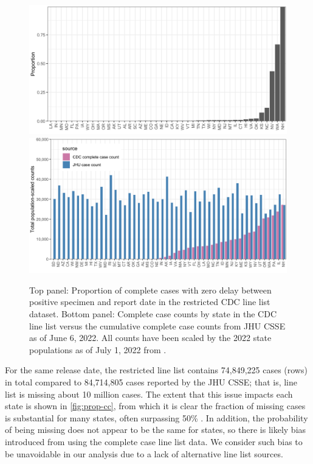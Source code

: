\documentclass{article}
\begin{document}
\begin{figure}[!tb]
\centering
\includegraphics[width=0.9\linewidth]{prop_cc_zero_delay.pdf}\\
\includegraphics[width=0.9\linewidth]{prop_cc_cdc_vs_jhu.pdf} 
\caption{Top panel: Proportion of complete cases with zero delay between
    positive specimen and report date in the restricted CDC line list dataset.
    Bottom panel: Complete case counts by state in the CDC line list versus the
    cumulative complete case counts from JHU CSSE as of June 6, 2022. All
    counts have been scaled by the 2022 state populations as of July 1, 2022
    from \citet{uscensus2022annual}.}
\label{fig:prop-cc}
\end{figure}

For the same release date, the restricted line list contains 74,849,225 cases
(rows) in total compared to 84,714,805 cases reported by the JHU CSSE; that is,
line list is missing about 10 million cases. The extent that this issue impacts
each state is shown in \autoref{fig:prop-cc}, from which it is clear
the fraction of missing cases is substantial for many states, often surpassing
50\% \citep{jahja2022real}. In addition, the probability of being missing does
not appear to be the same for states, so there is likely bias introduced from
using the complete case line list data. We consider such bias to be unavoidable
in our analysis due to a lack of alternative line list sources.
\end{document}
